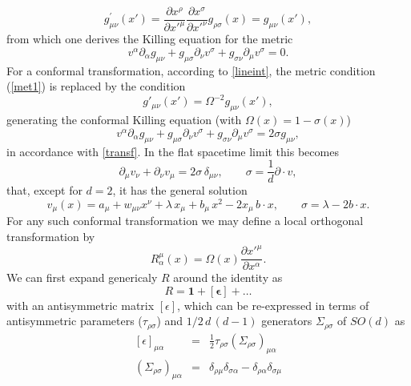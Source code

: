 \documentclass[a4paper,11pt,openright,twoside]{book}
\numberwithin{equation}{section}
\begin{document}
\begin{equation}
	g^\prime_{\mu\nu}(x')=\frac{\partial x^\rho  }{\partial x'^\mu }\frac{\partial x^\sigma}{\partial x'^\nu} g_{\rho\sigma}(x)= g_{\mu\nu}(x'),
\end{equation}
from which one derives the Killing equation for the metric
\begin{equation}
	v^\alpha\partial_\alpha g_{\mu\nu} + g_{\mu\sigma} \partial_\nu v^\sigma + 
	g_{\sigma \nu} \partial_\mu v^\sigma =0.
\end{equation}
For a conformal transformation, according to \eqref{lineint}, the metric condition (\ref{met1}) is replaced by the condition 
\begin{equation}
	g'_{\mu\nu}(x')=\Omega^{-2} g_{\mu\nu}(x'),
\end{equation}
generating the conformal Killing equation (with $\Omega(x)= 1-\sigma(x)$)
\begin{equation}
	v^\alpha\partial_\alpha g_{\mu\nu} + g_{\mu\sigma} \partial_\nu v^\sigma + 
	g_{\sigma \nu} \partial_\mu v^\sigma=2 \sigma g_{\mu\nu},
\end{equation}
in accordance with \eqref{transf}. In the flat spacetime limit this becomes 
\begin{equation}
	\label{sigma}
	\partial_\mu v_\nu + 
	\partial_\nu v_\mu=2 \sigma\, \delta_{\mu\nu},\qquad  \sigma=\frac{1}{d} \partial \cdot v,
\end{equation}
that, except for $d=2$, it has the general solution
\begin{equation}
	v_\mu(x)=a_\mu+w_{\mu\nu}x^{\nu}+\lambda\,x_\mu+b_\mu\,x^2-2x_\mu\,b\cdot x,\qquad \sigma=\lambda-2b\cdot x. 
\end{equation}
For any such conformal transformation we may define a local orthogonal transformation by 
\begin{equation}
	\label{rot1}
	R^\mu_\alpha(x)=\Omega(x) \frac{\partial x'^\mu}{\partial x^\alpha}.
\end{equation}
We can first expand genericaly $R$ around the identity as 
\begin{equation}
	R=\mathbf{ 1  } + \left[\mathbf{\epsilon}\right] +\ldots
\end{equation}
with an antisymmetric matrix $\left[\epsilon\right]$, which can be re-expressed in terms of antisymmetric parameters 
($\tau_{\rho\sigma}$) and $1/2 \,d\, (d-1)$ generators $\Sigma_{\rho\sigma}$ of $SO(d)$ as 
\begin{eqnarray}
	\left[\epsilon\right]_{\mu\alpha}&=&\frac{1}{2} \tau_{\rho\sigma}\left(\Sigma_{\rho\sigma}\right)_{\mu\alpha}\nonumber \\
	\left(\Sigma_{\rho\sigma}\right)_{\mu\alpha}&=&\delta_{\rho\mu}\delta_{\sigma\alpha}-\delta_{\rho\alpha}\delta_{\sigma\mu}
\end{eqnarray}
\end{document}
